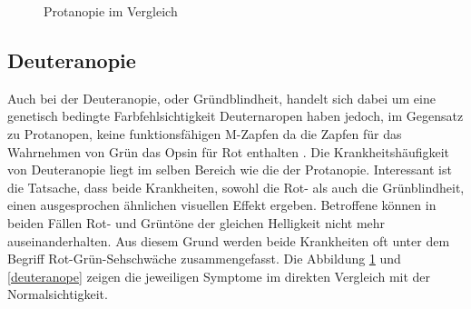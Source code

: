 \documentclass[a4paper]{article}
\begin{document}
\begin{figure}[H]
\centering
{}
\caption{Protanopie im Vergleich}
\label{protanope}
\end{figure}

\subsection*{Deuteranopie}
Auch bei der Deuteranopie, oder Gründblindheit, handelt sich dabei um eine genetisch bedingte Farbfehlsichtigkeit Deuternaropen haben jedoch, im Gegensatz zu Protanopen, keine funktionsfähigen M-Zapfen da die Zapfen für das Wahrnehmen von Grün das Opsin für Rot enthalten \cite{WP-D}. Die Krankheitshäufigkeit von Deuteranopie liegt im selben Bereich wie die der Protanopie. Interessant ist die Tatsache, dass beide Krankheiten, sowohl die Rot- als auch die Grünblindheit, einen ausgesprochen ähnlichen visuellen Effekt ergeben. Betroffene können in beiden Fällen Rot- und Grüntöne der gleichen Helligkeit nicht mehr auseinanderhalten. Aus diesem Grund werden beide Krankheiten oft unter dem Begriff Rot-Grün-Sehschwäche zusammengefasst. Die Abbildung \ref{protanope} und \ref{deuteranope} zeigen die jeweiligen Symptome im direkten Vergleich mit der Normalsichtigkeit.
\end{document}
